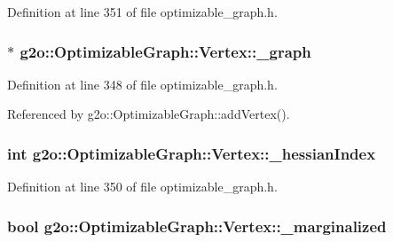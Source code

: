Definition at line 351 of file optimizable\+\_\+graph.\+h.

\subsubsection[{\texorpdfstring{\+\_\+graph}{_graph}}]{$\ast$ g2o\+::\+Optimizable\+Graph\+::\+Vertex\+::\+\_\+graph\hspace{0.3cm}{\ttfamily [protected]}}\hypertarget{classg2o_1_1OptimizableGraph_1_1Vertex_a6e14fd3ad8e531ead03b4d83cc7362ad}{}\label{classg2o_1_1OptimizableGraph_1_1Vertex_a6e14fd3ad8e531ead03b4d83cc7362ad}


Definition at line 348 of file optimizable\+\_\+graph.\+h.



Referenced by g2o\+::\+Optimizable\+Graph\+::add\+Vertex().

\subsubsection[{\texorpdfstring{\+\_\+hessian\+Index}{_hessianIndex}}]{\setlength{\rightskip}{0pt plus 5cm}int g2o\+::\+Optimizable\+Graph\+::\+Vertex\+::\+\_\+hessian\+Index\hspace{0.3cm}{\ttfamily [protected]}}\hypertarget{classg2o_1_1OptimizableGraph_1_1Vertex_aebf035f2c8177b5dac1bc650e0f0cf62}{}\label{classg2o_1_1OptimizableGraph_1_1Vertex_aebf035f2c8177b5dac1bc650e0f0cf62}


Definition at line 350 of file optimizable\+\_\+graph.\+h.

\subsubsection[{\texorpdfstring{\+\_\+marginalized}{_marginalized}}]{\setlength{\rightskip}{0pt plus 5cm}bool g2o\+::\+Optimizable\+Graph\+::\+Vertex\+::\+\_\+marginalized\hspace{0.3cm}{\ttfamily [protected]}}\hypertarget{classg2o_1_1OptimizableGraph_1_1Vertex_a5e9b3906c8ff800b9a0b16b10ed9fff0}{}\label{classg2o_1_1OptimizableGraph_1_1Vertex_a5e9b3906c8ff800b9a0b16b10ed9fff0}


